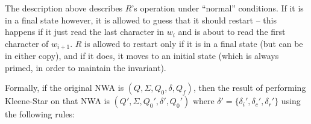 The description above describes $R$'s operation under ``normal''
conditions. If it is in a final state however, it is allowed to guess that it
should restart -- this happens if it just read the last character in $w_i$
and is about to read the first character of $w_{i+1}$. $R$ is allowed to
restart only if it is in a final state (but can be in either copy), and if it
does, it moves to an initial state (which is always primed, in order to
maintain the invariant).


Formally, if the original NWA is $(Q, \Sigma, Q_0, \delta, Q_f)$,
then the result of performing Kleene-Star on that NWA is $(Q', \Sigma,
Q_0', \delta', Q_0')$ where $\delta' =
\{\delta_i',\delta_c',\delta_r'\}$ using the following rules:



